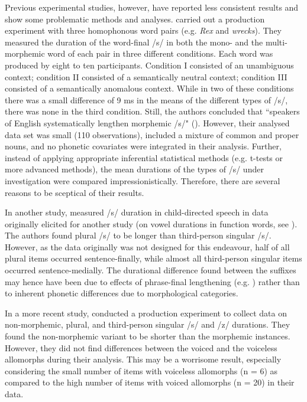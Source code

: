 Previous experimental studies, however, have reported less consistent results and show some problematic methods and analyses. \citet{Walsh1983} carried out a production experiment with three homophonous word pairs (e.g. \textit{Rex} and \textit{wrecks}). They measured the duration of the word-final /s/ in both the mono- and the multi-morphemic word of each pair in three different conditions. Each word was produced by eight to ten participants. Condition I consisted of an unambiguous context; condition II consisted of a semantically neutral context; condition III consisted of a semantically anomalous context.  While in two of these conditions there was a small difference of 9 ms in the means of the different types of /s/, there was none in the third condition. Still, the authors concluded that ``speakers of English systematically lengthen morphemic /s/" (\cite[204]{Walsh1983}). However, their analysed data set was small (110 observations), included a mixture of common and proper nouns, and no phonetic covariates were integrated in their analysis. Further, instead of applying appropriate inferential statistical methods (e.g. t-tests or more advanced methods), the mean durations of the types of /s/ under investigation were compared impressionistically. Therefore, there are several reasons to be sceptical of their results.

In another study, \citet{Hsieh1999} measured /s/ duration in child-directed speech in data originally elicited for another study (on vowel durations in function words, see \cite{Swanson1994}). The authors found plural /s/ to be longer than third-person singular /s/. However, as the data originally was not designed for this endeavour, half of all plural items occurred sentence-finally, while almost all third-person singular items occurred sentence-medially. The durational difference found between the suffixes may hence have been due to effects of phrase-final lengthening (e.g. \cite{Klatt1976,Wightman1992}) rather than to inherent phonetic differences due to morphological categories. 

In a more recent study, \citet{Seyfarth2017} conducted a production experiment to collect data on non-morphemic, plural, and third-person singular /s/ and /z/ durations. They found the non-morphemic variant to be shorter than the morphemic instances. However, they did not find differences between the voiced and the voiceless allomorphs during their analysis. This may be a worrisome result, especially considering the small number of items with voiceless allomorphs (n = 6) as compared to the high number of items with voiced allomorphs (n = 20) in their data. 

